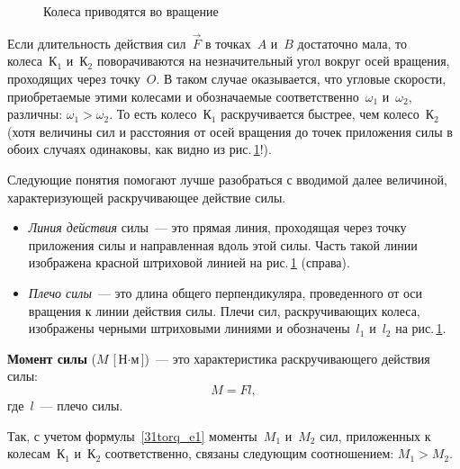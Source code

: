 \documentclass[main.tex]{subfiles}
\begin{document}
\begin{figure}[H]%
\hfill
\begin{subfigure}{\mylengtha}
\usebox{\myboxa}
\end{subfigure}%
\mbox{}
\hfill
\begin{subfigure}{\mylengthb}
\usebox{\myboxb}
\end{subfigure}%
\hfill
\mbox{}
\caption{Колеса приводятся во вращение}
\label{fig:p44}
\end{figure}


Если длительность действия сил~$\vec F$ в точках~$A$ и~$B$ достаточно мала, то колеса~К$_1$ и~К$_2$ поворачиваются на незначительный угол вокруг осей вращения, проходящих через точку~$O$. В таком случае оказывается, что угловые скорости, приобретаемые этими колесами и обозначаемые соответственно~$\omega_1$ и~$\omega_2$, различны: $\omega_1>\omega_2$. То есть колесо~К$_1$ раскручивается быстрее, чем колесо~К$_2$ (хотя величины сил и расстояния от осей вращения до точек приложения силы в обоих случаях одинаковы, как видно из рис.\,\ref{fig:p44}!).

Следующие понятия помогают лучше разобраться с вводимой далее величиной, характеризующей раскручивающее действие силы.
\begin{itemize}
    \item \emph{Линия действия} силы~--- это прямая линия, проходящая через точку приложения силы и направленная вдоль этой силы. Часть такой линии  изображена красной штриховой линией на рис.\,\ref{fig:p44} (справа).
    \item \emph{Плечо силы}~--- это длина общего перпендикуляра, проведенного от оси вращения к линии действия силы. Плечи сил, раскручивающих колеса, изображены черными штриховыми линиями и обозначены~$l_1$ и~$l_2$ на рис.\,\ref{fig:p44}. 
\end{itemize}

\textbf{Момент силы} ($M$ [$\text{Н}\cdot\text{м}$])~--- это характеристика раскручивающего действия силы:
\begin{equation}\label{31torq_e1}
    M=Fl,
\end{equation}
где~$l$~--- плечо силы.

Так, с учетом формулы~\eqref{31torq_e1} моменты~$M_1$ и~$M_2$ сил, приложенных к колесам~К$_1$ и~К$_2$ соответственно, связаны следующим соотношением: $M_1>M_2$.
 









 
\end{document}
